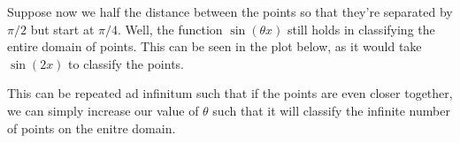 \documentclass[12pt]{article}
\begin{document}
\begin{enumerate}
Suppose now we half the distance between the points so that they're separated by $\pi/2$ but start at $\pi/4$. Well, the function $\sin(\theta x)$ still holds in classifying the entire domain of points. This can be seen in the plot below, as it would take $\sin (2x)$ to classify the points.


This can be repeated ad infinitum such that if the points are even closer together, we can simply increase our value of $\theta$ such that it will classify the infinite number of points on the enitre domain.
\end{enumerate}
 
\end{document}
